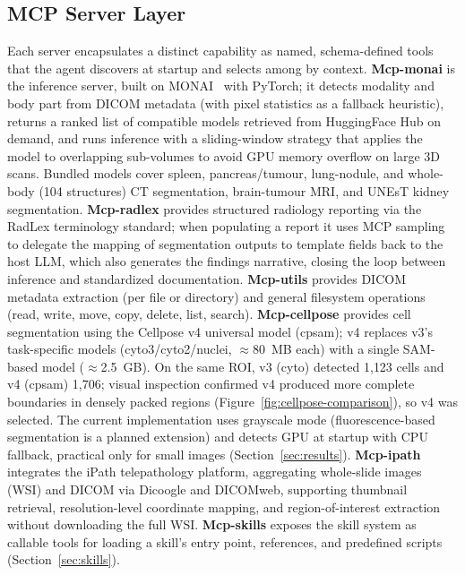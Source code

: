 \documentclass[preprint,12pt]{elsarticle}
\begin{document}
\subsection{MCP Server Layer}
Each server encapsulates a distinct capability as named, schema-defined tools that the agent discovers at startup and selects among by context. \textbf{Mcp-monai} is the inference server, built on MONAI~\cite{monai} with PyTorch; it detects modality and body part from DICOM metadata (with pixel statistics as a fallback heuristic), returns a ranked list of compatible models retrieved from HuggingFace Hub on demand, and runs inference with a sliding-window strategy that applies the model to overlapping sub-volumes to avoid GPU memory overflow on large 3D scans. Bundled models cover spleen, pancreas/tumour, lung-nodule, and whole-body (104 structures) CT segmentation, brain-tumour MRI, and UNEsT kidney segmentation. \textbf{Mcp-radlex} provides structured radiology reporting via the RadLex terminology standard; when populating a report it uses MCP sampling to delegate the mapping of segmentation outputs to template fields back to the host LLM, which also generates the findings narrative, closing the loop between inference and standardized documentation. \textbf{Mcp-utils} provides DICOM metadata extraction (per file or directory) and general filesystem operations (read, write, move, copy, delete, list, search). \textbf{Mcp-cellpose} provides cell segmentation using the Cellpose v4 universal model (cpsam); v4 replaces v3's task-specific models (cyto3/cyto2/nuclei, $\approx$80~MB each) with a single SAM-based model ($\approx$2.5~GB). On the same ROI, v3 (cyto) detected 1{,}123 cells and v4 (cpsam) 1{,}706; visual inspection confirmed v4 produced more complete boundaries in densely packed regions (Figure~\ref{fig:cellpose-comparison}), so v4 was selected. The current implementation uses grayscale mode (fluorescence-based segmentation is a planned extension) and detects GPU at startup with CPU fallback, practical only for small images (Section~\ref{sec:results}). \textbf{Mcp-ipath} integrates the iPath telepathology platform, aggregating whole-slide images (WSI) and DICOM via Dicoogle and DICOMweb, supporting thumbnail retrieval, resolution-level coordinate mapping, and region-of-interest extraction without downloading the full WSI. \textbf{Mcp-skills} exposes the skill system as callable tools for loading a skill's entry point, references, and predefined scripts (Section~\ref{sec:skills}).
\end{document}
